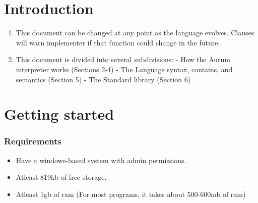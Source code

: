 \documentclass[12pt, letterpaper, oneside]{article}
\begin{document}
	\maketitle
	\renewcommand{\thepage}{Abstract-\roman{page}}
	\begin{abstract}
		This document specifies the syntax, form, and the process of \newline interpretation in the programming language Aurum. Its purpose is to explain how languages work, how that impacts the Aurum programming language, as well the form and style of the Aurum language. While this document isn't a full tutorial, it intends to serve as both a reference for Aurum programmers, as well an intro to the principles of interpreter design.
		\newline	
		Sections are included that clarify how various stages of the Aurum interpreter work, the syntax of Aurum, and includes documentation, and usage examples on its standard library functions.
		\newline
		This document will change as the Aurum programming language changes.
		
	\end{abstract}
	\renewcommand{\thepage}{\roman{page}}
	\newpage
	\tableofcontents
	\newpage
	\section{Introduction}
	\begin{enumerate}
		\item This document can be changed at any point as the language evolves. Clauses will warn implementer if that function could change in the future.
		\item This document is divided into several subdivisions:
		- How the Aurum interpreter works (Sections 2-4)
		- The Language syntax, contains, and semantics (Section 5)
		- The Standard library (Section 6)
	\end{enumerate}
	\newpage
	\section{Getting started}
		\subsubsection{Requirements}
			\begin{itemize}
				\item[--] Have a windows-based system with admin permissions.
				\item[--] Atleast 819kb of free storage.
				\item[--] Atleast 1gb of ram (For most programs, it takes about 500-600mb of ram)
			\end{itemize}
\end{document}
